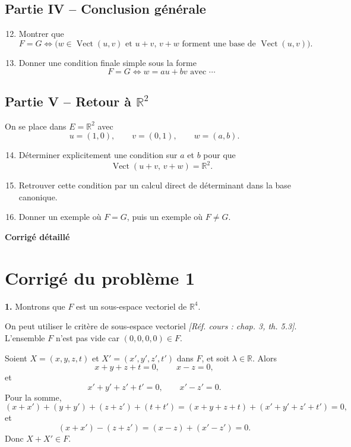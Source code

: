 \documentclass[11pt,a4paper]{article}
\newcommand{\R}{\mathbb{R}}
\newcommand{\Vect}{\operatorname{Vect}}
\newcommand{\cours}[1]{\textit{[Réf. cours : #1]}}
\newcommand{\p}[1]{\medskip\noindent\textbf{#1.}}
\begin{document}
\subsection*{Partie IV -- Conclusion générale}
\begin{enumerate}[label=\arabic*.]
    \setcounter{enumi}{11}
    \item Montrer que
    \[
    F=G \iff \bigl(w\in\Vect(u,v)\text{ et }u+v,\,v+w\text{ forment une base de }\Vect(u,v)\bigr).
    \]
    \item Donner une condition finale simple sous la forme
    \[
    F=G\iff w=au+bv\text{ avec }\cdots
    \]
\end{enumerate}

\subsection*{Partie V -- Retour à $\R^2$}
On se place dans $E=\R^2$ avec
\[
u=(1,0),\qquad v=(0,1),\qquad w=(a,b).
\]
\begin{enumerate}[label=\arabic*.]
    \setcounter{enumi}{13}
    \item Déterminer explicitement une condition sur $a$ et $b$ pour que
    \[
    \Vect(u+v,\,v+w)=\R^2.
    \]
    \item Retrouver cette condition par un calcul direct de déterminant dans la base canonique.
    \item Donner un exemple où $F=G$, puis un exemple où $F\neq G$.
\end{enumerate}

\newpage
\begin{center}
\textbf{Corrigé détaillé}
\end{center}

\section*{Corrigé du problème 1}


\p{1} Montrons que $F$ est un sous-espace vectoriel de $\R^4$.

On peut utiliser le critère de sous-espace vectoriel \cours{chap. 3, th. 5.3}.
L'ensemble $F$ n'est pas vide car $(0,0,0,0)\in F$.

Soient $X=(x,y,z,t)$ et $X'=(x',y',z',t')$ dans $F$, et soit $\lambda\in\R$.
Alors
\[
 x+y+z+t=0,\qquad x-z=0,
\]
et
\[
 x'+y'+z'+t'=0,\qquad x'-z'=0.
\]
Pour la somme,
\[
(x+x')+(y+y')+(z+z')+(t+t')=(x+y+z+t)+(x'+y'+z'+t')=0,
\]
et
\[
(x+x')-(z+z')=(x-z)+(x'-z')=0.
\]
Donc $X+X'\in F$.
\end{document}
